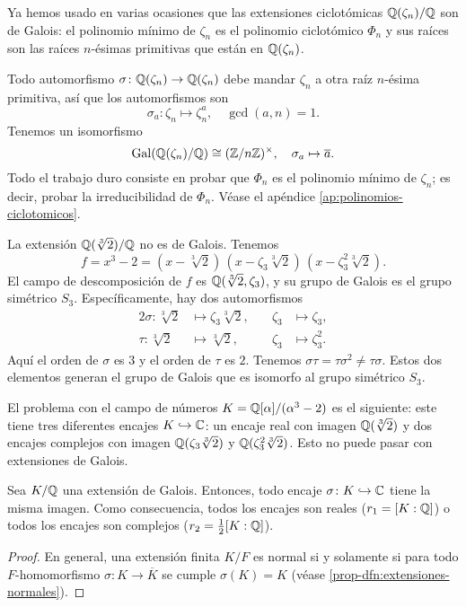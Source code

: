 \begin{ejemplo}
  Ya hemos usado en varias ocasiones que las extensiones ciclotómicas
  $\mathbb{Q} (\zeta_n)/\mathbb{Q}$ son de Galois: el polinomio mínimo de $\zeta_n$
  es el polinomio ciclotómico $\Phi_n$ y sus raíces son las raíces
  $n$-ésimas primitivas que están en $\mathbb{Q} (\zeta_n)$.

  Todo automorfismo $\sigma\colon \mathbb{Q} (\zeta_n) \to \mathbb{Q} (\zeta_n)$ debe mandar
  $\zeta_n$ a otra raíz $n$-ésima primitiva, así que los automorfismos son
  $$\sigma_a\colon \zeta_n \mapsto \zeta_n^a, \quad \gcd (a,n) = 1.$$
  Tenemos un isomorfismo
  \[ \operatorname{Gal} (\mathbb{Q} (\zeta_n)/\mathbb{Q}) \cong (\mathbb{Z}/n\mathbb{Z})^\times,
     \quad \sigma_a \mapsto \overline{a}. \]
  Todo el trabajo duro consiste en probar que $\Phi_n$ es el polinomio mínimo
  de $\zeta_n$; es decir, probar la irreducibilidad de $\Phi_n$. Véase el
  apéndice \ref{ap:polinomios-ciclotomicos}.
\end{ejemplo}

\begin{ejemplo}
  La extensión $\mathbb{Q} (\sqrt[3]{2})/\mathbb{Q}$ no es de Galois. Tenemos
  \[ f = x^3 - 2 =
     (x - \sqrt[3]{2})\,(x - \zeta_3\sqrt[3]{2})\,(x - \zeta_3^2\sqrt[3]{2}). \]
  El campo de descomposición de $f$ es $\mathbb{Q} (\sqrt[3]{2}, \zeta_3)$,
  y su grupo de Galois es el grupo simétrico $S_3$. Específicamente, hay dos
  automorfismos
  \begin{alignat*}{2}
    \sigma\colon \sqrt[3]{2} & \mapsto \zeta_3\sqrt[3]{2}, \quad & \zeta_3 & \mapsto \zeta_3,\\
    \tau\colon \sqrt[3]{2} & \mapsto \sqrt[3]{2}, & \zeta_3 & \mapsto \zeta_3^2.
  \end{alignat*}
  Aquí el orden de $\sigma$ es $3$ y el orden de $\tau$ es $2$. Tenemos
  $\sigma\tau = \tau\sigma^2 \ne \tau\sigma$. Estos dos elementos generan
  el grupo de Galois que es isomorfo al grupo simétrico $S_3$.
\end{ejemplo}

El problema con el campo de números $K = \mathbb{Q} [\alpha]/(\alpha^3 - 2)$
es el siguiente: este tiene tres diferentes encajes $K \hookrightarrow \mathbb{C}$:
un encaje real con imagen $\mathbb{Q} (\sqrt[3]{2})$ y dos encajes complejos con imagen
$\mathbb{Q} (\zeta_3\sqrt[3]{2})$ y $\mathbb{Q} (\zeta_3^2\sqrt[3]{2})$. Esto no puede pasar
con extensiones de Galois.

\begin{proposicion}
  Sea $K/\mathbb{Q}$ una extensión de Galois. Entonces, todo encaje
  $\sigma\colon K \hookrightarrow \mathbb{C}$ tiene la misma imagen. Como consecuencia,
  todos los encajes son reales ($r_1 = [K : \mathbb{Q}]$) o todos los encajes son
  complejos ($r_2 = \frac{1}{2} [K : \mathbb{Q}]$).

  \begin{proof}
    En general, una extensión finita $K/F$ es normal si y solamente si para todo
    $F$-homomorfismo $\sigma\colon K \to \overline{K}$ se cumple
    $\sigma (K) = K$ (véase \ref{prop-dfn:extensiones-normales}).
  \end{proof}
\end{proposicion}

